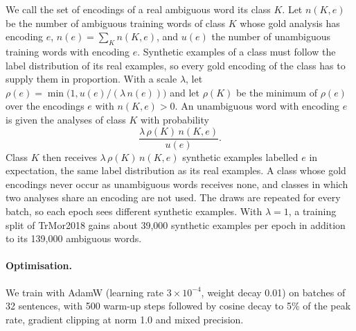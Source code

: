 We call the set of encodings of a real ambiguous word its class $K$. Let $n(K,e)$ be the number of ambiguous training words of class $K$ whose gold analysis has encoding $e$, $n(e) = \sum_K n(K,e)$, and $u(e)$ the number of unambiguous training words with encoding $e$. Synthetic examples of a class must follow the label distribution of its real examples, so every gold encoding of the class has to supply them in proportion. With a scale $\lambda$, let $\rho(e) = \min\big(1, u(e) / (\lambda\, n(e))\big)$ and let $\rho(K)$ be the minimum of $\rho(e)$ over the encodings $e$ with $n(K,e) > 0$. An unambiguous word with encoding $e$ is given the analyses of class $K$ with probability
\begin{equation}
\frac{\lambda\, \rho(K)\, n(K,e)}{u(e)}.
\end{equation}
Class $K$ then receives $\lambda\, \rho(K)\, n(K,e)$ synthetic examples labelled $e$ in expectation, the same label distribution as its real examples. A class whose gold encodings never occur as unambiguous words receives none, and classes in which two analyses share an encoding are not used. The draws are repeated for every batch, so each epoch sees different synthetic examples. With $\lambda = 1$, a training split of TrMor2018 gains about 39,000 synthetic examples per epoch in addition to its 139,000 ambiguous words.

\paragraph{Optimisation.}
We train with AdamW (learning rate $3\times10^{-4}$, weight decay 0.01) on batches of 32 sentences, with 500 warm-up steps followed by cosine decay to 5\% of the peak rate, gradient clipping at norm 1.0 and mixed precision.
